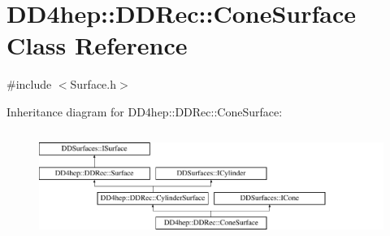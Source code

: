 \hypertarget{class_d_d4hep_1_1_d_d_rec_1_1_cone_surface}{}\section{D\+D4hep\+:\+:D\+D\+Rec\+:\+:Cone\+Surface Class Reference}
\label{class_d_d4hep_1_1_d_d_rec_1_1_cone_surface}


{\ttfamily \#include $<$Surface.\+h$>$}

Inheritance diagram for D\+D4hep\+:\+:D\+D\+Rec\+:\+:Cone\+Surface\+:\begin{figure}[H]
\begin{center}
\leavevmode
\includegraphics[height=3.538705cm]{class_d_d4hep_1_1_d_d_rec_1_1_cone_surface}
\end{center}
\end{figure}
